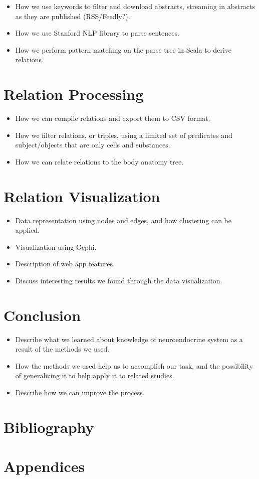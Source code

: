 \documentclass[11pt]{article}
\begin{document}
\begin{itemize}
\item How we use keywords to filter and download abstracts, streaming in abstracts as they are published (RSS/Feedly?).
\item How we use Stanford NLP library to parse sentences.
\item How we perform pattern matching on the parse tree in Scala to derive relations.
\end{itemize}

\section{Relation Processing}
\begin{itemize}
\item How we can compile relations and export them to CSV format.
\item How we filter relations, or triples, using a limited set of predicates and subject/objects that are only cells and substances.
\item How we can relate relations to the body anatomy tree.
\end{itemize}

\section{Relation Visualization}
\begin{itemize}
\item Data representation using nodes and edges, and how clustering can be applied.
\item Visualization using Gephi.
\item Description of web app features.
\item Discuss interesting results we found through the data visualization.
\end{itemize}

\section{Conclusion}
\begin{itemize}
\item Describe what we learned about knowledge of neuroendocrine system as a result of the methods we used.
\item How the methods we used help us to accomplish our task, and the possibility of generalizing it to help apply it to related studies.
\item Describe how we can improve the process.
\end{itemize}

\section{Bibliography}

\section{Appendices}
\end{document}
